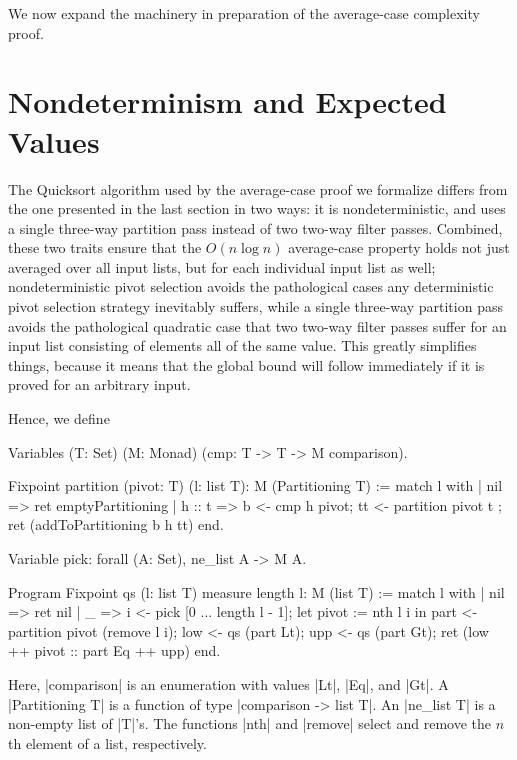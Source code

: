\documentclass[runningheads]{llncs}
\begin{document}
We now expand the machinery in preparation of the average-case complexity proof.

\section{Nondeterminism and Expected Values}
\label{nondetexpec}

The Quicksort algorithm used by the average-case proof we formalize differs from the one presented in the last section in two ways: it is nondeterministic, and uses a single three-way partition pass instead of two two-way filter passes. Combined, these two traits ensure that the $O(n \log n)$ average-case property holds not just averaged over all input lists, but for each individual input list as well; nondeterministic pivot selection avoids the pathological cases any deterministic pivot selection strategy inevitably suffers, while a single three-way partition pass avoids the pathological quadratic case that two two-way filter passes suffer for an input list consisting of elements all of the same value. This greatly simplifies things, because it means that the global bound will follow immediately if it is proved for an arbitrary input.

Hence, we define

\parbox{\textwidth}{\begin{code}
  Variables (T: Set) (M: Monad) (cmp: T -> T -> M comparison).

  Fixpoint partition (pivot: T) (l: list T): M (Partitioning T) :=
    match l with
    | nil => ret emptyPartitioning
    | h :: t =>
        b <- cmp h pivot;
        tt <- partition pivot t ;
        ret (addToPartitioning b h tt)
    end.

  Variable pick: forall (A: Set), ne_list A -> M A.

  Program Fixpoint qs (l: list T) {measure length l}: M (list T) :=
    match l with
    | nil => ret nil
    | _ =>
        i <- pick [0 ... length l - 1];
        let pivot := nth l i in
        part <- partition pivot (remove l i);
        low <- qs (part Lt);
        upp <- qs (part Gt);
        ret (low ++ pivot :: part Eq ++ upp)
    end.
\end{code}}
Here, |comparison| is an enumeration with values |Lt|, |Eq|, and |Gt|. A |Partitioning T| is a function of type |comparison -> list T|. An |ne_list T| is a non-empty list of |T|'s. The functions |nth| and |remove| select and remove the $n$th element of a list, respectively.
\end{document}
